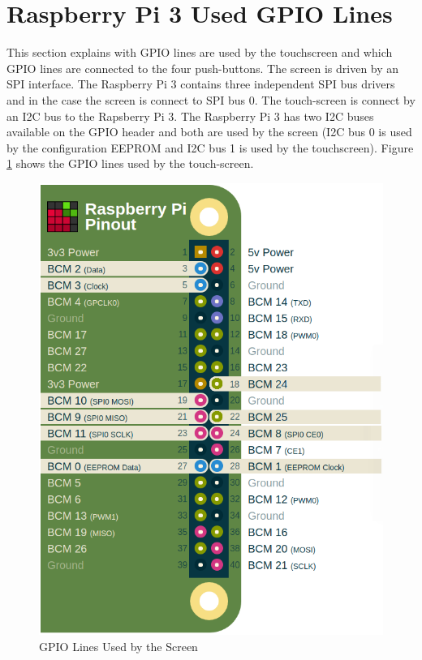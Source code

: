 \documentclass{article}
\begin{document}
\section{Raspberry Pi 3 Used GPIO Lines}

This section explains with GPIO lines are used by the touchscreen and which GPIO lines are connected to the four push-buttons. The screen is driven by an SPI interface. The Raspberry Pi 3 contains three independent SPI bus drivers and in the case the screen is connect to SPI bus 0. The touch-screen is connect by an I2C bus to the Rapsberry Pi 3. The Raspberry Pi 3 has two I2C buses available on the GPIO header and both are used by the screen (I2C bus 0 is used by the configuration EEPROM and I2C bus 1 is used by the touchscreen). Figure \ref{Screen_Used_GPIO} shows the GPIO lines used by the touch-screen.

	\begin{figure}[H]
		\centering
		\includegraphics[scale=0.3]{pics/GPIO_Used_By_Screen.png}
		\caption{GPIO Lines Used by the Screen}
		\label{Screen_Used_GPIO}
	\end{figure} 
\end{document}
